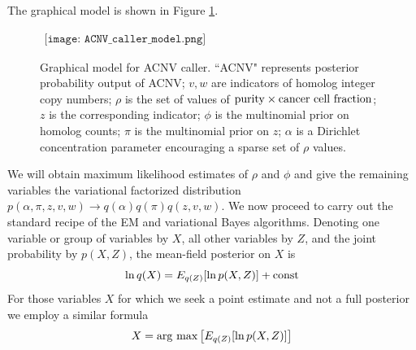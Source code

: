 \documentclass[nofootinbib,amssymb,amsmath]{revtex4}
\begin{document}
The graphical model is shown in Figure \ref{acnv_caller_fig}.

\begin{figure}
$
\begin{array}{c}
\texttt{[image: ACNV\_caller\_model.png]} 
\end{array}
$
\label{acnv_caller_fig}
\caption{Graphical model for ACNV caller.  ``ACNV" represents posterior probability output of ACNV; $v,w$ are indicators of homolog integer copy numbers; $\rho$ is the set of values of ${\rm purity} \times {\rm cancer~cell~fraction}$; $z$ is the corresponding indicator; $\phi$ is the multinomial prior on homolog counts; $\pi$ is the multinomial prior on $z$; $\alpha$ is a Dirichlet concentration parameter encouraging a sparse set of $\rho$ values.} 
\end{figure}

We will obtain maximum likelihood estimates of $\rho$ and $\phi$ and give the remaining variables the variational factorized distribution $p(\alpha, \pi, z, v, w) \rightarrow q(\alpha) q(\pi) q(z,v,w)$. We now proceed to carry out the standard recipe of the EM and variational Bayes algorithms.  Denoting one variable or group of variables by $X$, all other variables by $Z$, and the joint probability by $p(X,Z)$, the mean-field posterior on $X$ is
%
\begin{equation}
\ln q(X) = E_{q(Z)}[\ln p(X,Z)] + {\rm const}
\end{equation}
%
For those variables $X$ for which we seek a point estimate and not a full posterior we employ a similar formula
%
\begin{equation}
X = {\rm arg~max} \left[ E_{q(Z)}[\ln p(X,Z)] \right]
\end{equation}
%
\end{document}
